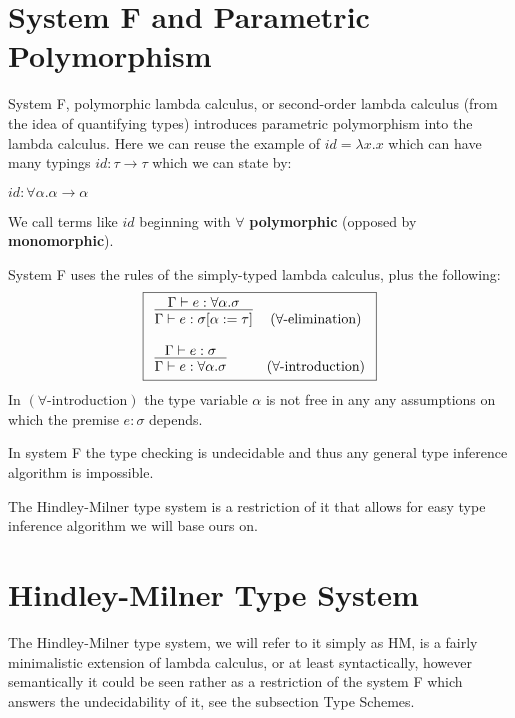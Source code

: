 \section{System F and Parametric Polymorphism} %

System F, polymorphic lambda calculus, or second-order lambda calculus (from the idea of quantifying types) introduces parametric polymorphism into the lambda calculus. Here we can reuse the example of $id = \lambda x . x$ which can have many typings $id : \tau \rightarrow \tau$ which we can state by:

$id : \forall \alpha . \alpha \rightarrow \alpha$

We call terms like $id$ beginning with $\forall$ \textbf{polymorphic} (opposed by \textbf{monomorphic}).

\begin{defn}
    System F uses the rules of the simply-typed lambda calculus, plus the following:
    $$\boxed{\begin{array}{l c}
        \infer{\Gamma \vdash e : \sigma [\alpha := \tau]}{\Gamma \vdash e : \forall \alpha . \sigma} & (\text{$\forall$-elimination})\\\\
        \infer{\Gamma \vdash e : \forall \alpha . \sigma}{\Gamma \vdash e : \sigma} & (\text{$\forall$-introduction})
    \end{array}}$$
    In $(\text{$\forall$-introduction})$ the type variable $\alpha$ is not free in any any assumptions on which the premise $e : \sigma$ depends. %
\end{defn}

In system F the type checking is undecidable and thus any general type inference algorithm is impossible.

The Hindley-Milner type system is a restriction of it %
that allows for easy type inference algorithm we will base ours on.

\section{Hindley-Milner Type System}

The Hindley-Milner type system, we will refer to it simply as HM, is a fairly minimalistic extension of lambda calculus, or at least syntactically, however semantically it could be seen rather as a restriction of the system F which answers the undecidability of it, see the subsection Type Schemes. %

